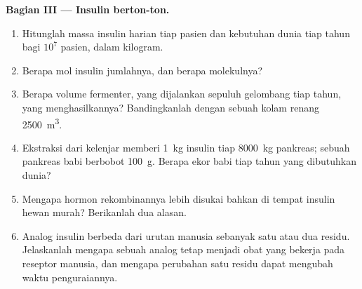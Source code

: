 \begin{problem}
\medskip
\noindent\textbf{Bagian III --- Insulin berton-ton.}
\begin{enumerate}[resume]
  \item Hitunglah massa insulin harian tiap pasien dan kebutuhan dunia
        tiap tahun bagi $10^{7}$ pasien, dalam kilogram.
  \item Berapa mol insulin jumlahnya, dan berapa molekulnya?
  \item Berapa volume fermenter, yang dijalankan sepuluh gelombang tiap tahun,
        yang menghasilkannya? Bandingkanlah dengan sebuah kolam renang
        \qty{2500}{m^3}.
  \item Ekstraksi dari kelenjar memberi \qty{1}{kg} insulin tiap
        \qty{8000}{kg} pankreas; sebuah pankreas babi berbobot
        \qty{100}{g}. Berapa ekor babi tiap tahun yang dibutuhkan dunia?
  \item Mengapa hormon rekombinannya lebih disukai bahkan di tempat insulin
        hewan murah? Berikanlah dua alasan.
  \item Analog insulin berbeda dari urutan manusia sebanyak satu atau dua
        residu. Jelaskanlah mengapa sebuah analog tetap menjadi obat yang
        bekerja pada reseptor manusia, dan mengapa perubahan satu residu
        dapat mengubah waktu penguraiannya.
\end{enumerate}


\end{problem}
